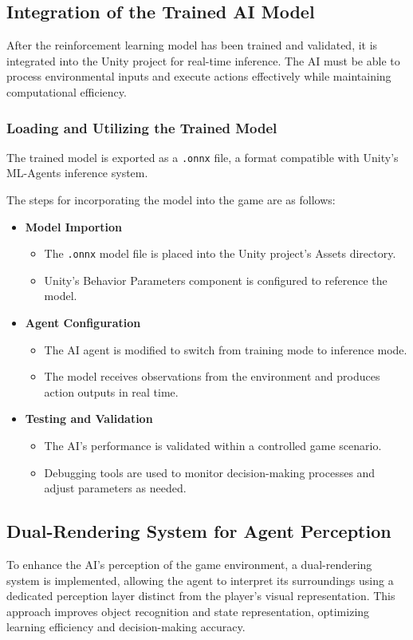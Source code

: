 \documentclass[12pt,oneside,openright,a4paper]{cpe-english-project}
\begin{document}
\subsection{Integration of the Trained AI Model}
After the reinforcement learning model has been trained and validated, it is integrated into the Unity project for real-time inference. The AI must be able to process environmental inputs and execute actions effectively while maintaining computational efficiency.
\subsubsection{Loading and Utilizing the Trained Model}
The trained model is exported as a \texttt{.onnx} file, a format compatible with Unity’s ML-Agents inference system.\par The steps for incorporating the model into the game are as follows:\par
\begin{itemize}
\item  \textbf{Model Importion}
\begin{itemize}
\item  The \texttt{.onnx} model file is placed into the Unity project’s Assets directory.
\item  Unity’s Behavior Parameters component is configured to reference the model.
\end{itemize}
\item  \textbf{Agent Configuration}
\begin{itemize}
\item  The AI agent is modified to switch from training mode to inference mode.
\item  The model receives observations from the environment and produces action outputs in real time.
\end{itemize}
\item  \textbf{Testing and Validation}
\begin{itemize}
\item  The AI’s performance is validated within a controlled game scenario.
\item  Debugging tools are used to monitor decision-making processes and adjust parameters as needed.
\end{itemize}
\end{itemize}
\subsection{Dual-Rendering System for Agent Perception}
To enhance the AI’s perception of the game environment, a dual-rendering system is implemented, allowing the agent to interpret its surroundings using a dedicated perception layer distinct from the player's visual representation. This approach improves object recognition and state representation, optimizing learning efficiency and decision-making accuracy.
\end{document}
